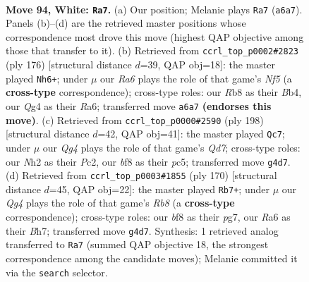 \documentclass[11pt]{article}
\begin{document}
\clearpage

\begin{figure}[p]\centering
\begin{subfigure}{0.46\textwidth}\centering
\resizebox{\linewidth}{!}{%
\newchessgame
\chessboard[
  setfen={1R3b2/6rk/R7/7K/6Q1/8/7N/8 w - - 5 94},
  showmover=false,
  pgfstyle=straightmove, color=movearrow, markmove={a6-a7}
]}
\caption{}
\end{subfigure}\hfill
\begin{subfigure}{0.46\textwidth}\centering
\resizebox{\linewidth}{!}{%
\newchessgame
\chessboard[
  setfen={8/5k2/R3r3/4bN2/1BK5/8/8/8 w - - 44 89},
  showmover=false,
  pgfstyle=straightmove, color=movearrow, markmove={f5-h6}
]}
\caption{}
\end{subfigure}
\\[4pt]
\begin{subfigure}{0.46\textwidth}\centering
\resizebox{\linewidth}{!}{%
\newchessgame
\chessboard[
  setfen={8/3Qb3/5k2/2p5/3r4/1K6/2P5/8 w - - 25 100},
  showmover=false,
  pgfstyle=straightmove, color=movearrow, markmove={d7-c7}
]}
\caption{}
\end{subfigure}\hfill
\begin{subfigure}{0.46\textwidth}\centering
\resizebox{\linewidth}{!}{%
\newchessgame
\chessboard[
  setfen={1R3r2/5kpB/8/8/4K3/8/8/8 w - - 75 86},
  showmover=false,
  pgfstyle=straightmove, color=movearrow, markmove={b8-b7}
]}
\caption{}
\end{subfigure}
\caption{\textbf{Move 94, White: \texttt{Ra7}.} (a) Our position; Melanie plays \texttt{Ra7} (\texttt{a6a7}). Panels (b)--(d) are the retrieved master positions whose correspondence most drove this move (highest QAP objective among those that transfer to it). (b) Retrieved from \texttt{ccrl\_top\_p0002\#2823} (ply 176) [structural distance $d$=39, QAP obj=18]: the master played \texttt{Nh6+}; under $\mu$ our \emph{Ra6} plays the role of that game's \emph{Nf5} (a \textbf{cross-type} correspondence); cross-type roles: our \emph{R}b8 as their \emph{B}b4, our \emph{Q}g4 as their \emph{R}a6; transferred move \texttt{a6a7} \textbf{(endorses this move)}. (c) Retrieved from \texttt{ccrl\_top\_p0000\#2590} (ply 198) [structural distance $d$=42, QAP obj=41]: the master played \texttt{Qc7}; under $\mu$ our \emph{Qg4} plays the role of that game's \emph{Qd7}; cross-type roles: our \emph{N}h2 as their \emph{P}c2, our \emph{b}f8 as their \emph{p}c5; transferred move \texttt{g4d7}. (d) Retrieved from \texttt{ccrl\_top\_p0003\#1855} (ply 170) [structural distance $d$=45, QAP obj=22]: the master played \texttt{Rb7+}; under $\mu$ our \emph{Qg4} plays the role of that game's \emph{Rb8} (a \textbf{cross-type} correspondence); cross-type roles: our \emph{b}f8 as their \emph{p}g7, our \emph{R}a6 as their \emph{B}h7; transferred move \texttt{g4d7}. Synthesis: 1 retrieved analog transferred to \texttt{Ra7} (summed QAP objective 18, the strongest correspondence among the candidate moves); Melanie committed it via the \texttt{search} selector.}
\label{fig:thought-m186}
\end{figure}
\end{document}
